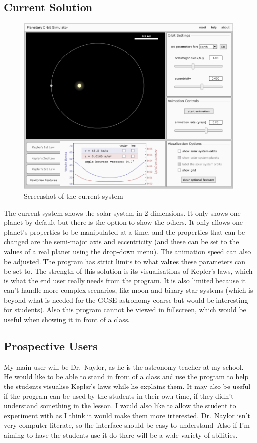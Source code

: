 \subsection{Current Solution}
\begin{figure}[h]
	\includegraphics[width=\textwidth]{./img/existing-solution.png}
	\caption{Screenshot of the current system}
	\label{fig:existing-solution}
\end{figure}
The current system shows the solar system in 2 dimensions. It only shows one
planet by default but there is the option to show the others. It only allows one
planet's properties to be manipulated at a time, and the properties that can be
changed are the semi-major axis and eccentricity (and these can be set to the
values of a real planet using the drop-down menu). The animation speed can also
be adjusted. The program has strict limits to what values these parameters can
be set to. The strength of this solution is its visualisations of Kepler's laws,
which is what the end user really needs from the program. It is also limited
because it can't handle more complex scenarios, like moon and binary star
systems (which is beyond what is needed for the GCSE astronomy coarse but would
be interesting for students). Also this program cannot be viewed in fullscreen,
which would be useful when showing it in front of a class.


\subsection{Prospective Users}
My main user will be Dr.~Naylor, as he is the astronomy teacher at my school. He
would like to be able to stand in front of a class and use the program to help
the students visualise Kepler's laws while he explains them. It may also be
useful if the program can be used by the students in their own time, if they
didn't understand something in the lesson. I would also like to allow the
student to experiment with as I think it would make them more interested.
Dr.~Naylor isn't very computer literate, so the interface should be easy to
understand. Also if I'm aiming to have the students use it do there will be a
wide variety of abilities. 

